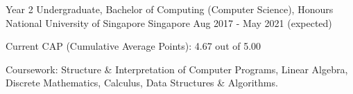 

\begin{cventries}

  \cventry
    {Year 2 Undergraduate, Bachelor of Computing (Computer Science), Honours} %
    {National University of Singapore} %
    {Singapore} %
    {Aug 2017 - May 2021 (expected)} %
    {
      \begin{cvitems} %
        \item {Current CAP (Cumulative Average Points): 4.67 out of 5.00}
        \item {Coursework: Structure \& Interpretation of Computer Programs, Linear Algebra, Discrete Mathematics, Calculus, Data Structures \& Algorithms.}
      \end{cvitems}
    }
    
    


\end{cventries}
